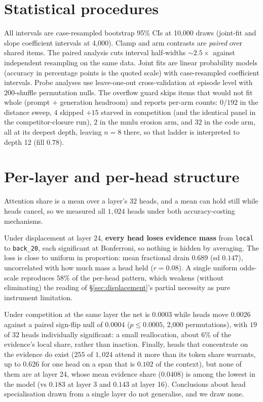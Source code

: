 \documentclass{article}
\begin{document}
\section{Statistical procedures}
\label{app:stats}

All intervals are case-resampled bootstrap 95\% CIs at 10{,}000 draws (joint-fit and slope
coefficient intervals at 4{,}000). Clamp and arm contrasts
are \emph{paired} over shared items. The paired analysis cuts interval half-widths
${\sim}2.5\times$ against independent resampling on the same data. Joint fits are linear
probability models (accuracy in percentage points is the quoted scale) with case-resampled
coefficient intervals. Probe analyses use leave-one-out cross-validation at episode level with
200-shuffle permutation nulls. The overflow guard skips items that would not fit whole
(prompt $+$ generation headroom) and reports per-arm counts: $0/192$ in the distance sweep,
$4$ skipped $+15$ starved in competition (and the identical panel in the competitor-closure
run), $2$ in the mmlu erosion arm, and $32$ in the code arm, all at its deepest depth, leaving
$n{=}8$ there, so that ladder is interpreted to depth 12 (fill $0.78$).

\section{Per-layer and per-head structure}
\label{app:heads}

Attention share is a mean over a layer's $32$ heads, and a mean can hold still while heads
cancel, so we measured all $1{,}024$ heads under both accuracy-costing mechanisms.

Under displacement at layer 24, \textbf{every head loses evidence mass} from \texttt{local} to
\texttt{back\_20}, each significant at Bonferroni, so nothing is hidden by averaging. The loss
is close to uniform in proportion: mean fractional drain $0.689$ (sd $0.147$), uncorrelated
with how much mass a head held ($r{=}0.08$). A single uniform odds-scale reproduces $58\%$
of the per-head pattern, which weakens (without eliminating) the reading of
\S\ref{sec:displacement}'s partial necessity as pure instrument limitation.

Under competition at the same layer the net is $0.0003$ while heads move $0.0026$ against a
paired sign-flip null of $0.0004$ ($p\leq0.0005$, 2{,}000 permutations), with $19$ of $32$ heads
individually significant: a small reallocation, about $6\%$ of the evidence's local share,
rather than inaction. Finally, heads that concentrate on the evidence do exist ($255$ of
$1{,}024$ attend it more than its token share warrants, up to $0.626$ for one head on a span
that is $0.102$ of the context), but none of them are at layer 24, whose mean evidence share
($0.0408$) is among the lowest in the model (vs $0.183$ at layer 3 and $0.143$ at layer 16).
Conclusions about head specialisation drawn from a single layer do not generalise, and we draw
none.
\end{document}
